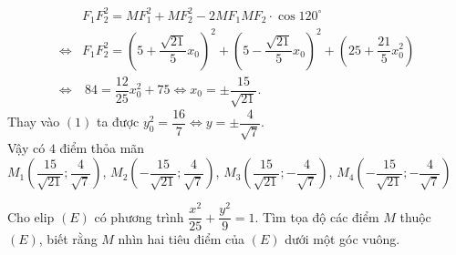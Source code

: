 \begin{bt}
{\begin{listEX}
		$$	\begin{aligned}			
			&F_1F_2^2=MF_1^2+MF_2^2-2MF_1 MF_2\cdot \cos 120^\circ\\
			\Leftrightarrow&  F_1F_2^2=\left(5+\dfrac{\sqrt{21}}{5}x_0\right)^2+\left(5-\dfrac{\sqrt{21}}{5}x_0\right)^2+\left(25+\dfrac{21}{5}x_0^2\right)\\
			\Leftrightarrow&\ 84=\dfrac{12}{25}x_0^2+75
			\Leftrightarrow x_0=\pm \dfrac{15}{\sqrt{21}}.
		\end{aligned}$$
			Thay vào $(1) $ ta được $y_0^2=\dfrac{16}{7} \Leftrightarrow y=\pm \dfrac{4}{\sqrt{7}}$.\\
			Vậy có $4$ điểm thỏa mãn\\
			$M_1\left(\dfrac{15}{\sqrt{21}}; \dfrac{4}{\sqrt{7}} \right)$, 	$M_2\left(-\dfrac{15}{\sqrt{21}}; \dfrac{4}{\sqrt{7}} \right)$,	$M_3\left(\dfrac{15}{\sqrt{21}}; -\dfrac{4}{\sqrt{7}} \right)$, 	$M_4\left(-\dfrac{15}{\sqrt{21}}; -\dfrac{4}{\sqrt{7}} \right)$
		\end{listEX}
	}
\end{bt}

\begin{bt}%
Cho elip $(E)$ có phương trình $\dfrac{x^2}{25}+\dfrac{y^2}{9}=1$. Tìm tọa độ các điểm $M$ thuộc $(E)$, biết rằng $M$ nhìn hai tiêu điểm của $(E)$ dưới một góc vuông.
\end{bt}

